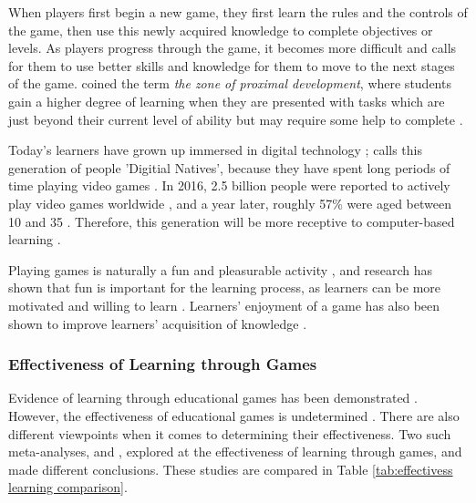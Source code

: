 \documentclass[a4paper,11.5pt]{report}
\numberwithin{figure}{section}
\numberwithin{table}{section}
\numberwithin{equation}{section}
\numberwithin{equation}{section}
\begin{document}
When players first begin a new game, they first learn the rules and the controls of the game, then use this newly acquired knowledge to complete objectives or levels. As players progress through the game, it becomes more difficult and calls for them to use better skills and knowledge for them to move to the next stages of the game. \citeauthor{vygotsky1978} coined the term \textit{the zone of proximal development}, where students gain a higher degree of learning when they are presented with tasks which are just beyond their current level of ability but may require some help to complete \citep{vygotsky1978}.

Today's learners have grown up immersed in digital technology \citep{Prensky2001}; \citeauthor{Prensky2001} calls this generation of people 'Digitial Natives', because they have spent long periods of time playing video games \citep{prensky2003}. In 2016, 2.5 billion people were reported to actively play video games worldwide \citep{Statista}, and a year later, roughly 57\% were aged between 10 and 35 \citep{Statistanewzoo}. Therefore, this generation will be more receptive to computer-based learning \citep{Girard2013}.

Playing games is naturally a fun and pleasurable activity \citep{Prensky2001}, and research has shown that fun is important for the learning process, as learners can be more motivated and willing to learn \citep{Bisson1996, Cordova1996}. Learners' enjoyment of a game has also been shown to improve learners' acquisition of knowledge \citep{giannakos2013}.



\subsubsection{Effectiveness of Learning through Games}

Evidence of learning through educational games has been demonstrated \citep{Connolly2012, Pieter2013, Girard2013}. However, the effectiveness of educational games is undetermined \citep{Connolly2012, Girard2013}. There are also different viewpoints when it comes to determining their effectiveness. Two such meta-analyses, \citet{Pieter2013} and \citet{Girard2013}, explored at the effectiveness of learning through games, and made different conclusions. These studies are compared in Table \ref{tab:effectivess learning comparison}.
\end{document}
